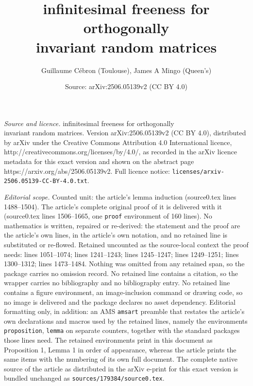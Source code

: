 \documentclass[10pt,a4paper]{amsart}
\title{infinitesimal freeness for orthogonally\\[5pt] invariant random matrices}
\author{Guillaume C\'ebron (Toulouse), James A Mingo (Queen's)}
\date{Source: arXiv:2506.05139v2 (CC BY 4.0)}
\begin{document}
\maketitle

\noindent\emph{Source and licence.} infinitesimal freeness for orthogonally\\[5pt] invariant random matrices. Version arXiv:2506.05139v2 (CC BY 4.0), distributed by arXiv under the Creative Commons Attribution 4.0 International licence, http://creativecommons.org/licenses/by/4.0/, as recorded in the arXiv licence metadata for this exact version and shown on the abstract page https://arxiv.org/abs/2506.05139v2. Full licence notice: \texttt{licenses/arxiv-2506.05139-CC-BY-4.0.txt}.\par\smallskip

\noindent\textit{Editorial scope.} Counted unit: the article's lemma induction (source0.tex lines 1488--1504). The article's complete original proof of it is delivered with it (source0.tex lines 1506--1665, one \texttt{proof} environment of 160 lines). No mathematics is written, repaired or re-derived: the statement and the proof are the article's own lines, in the article's own notation, and no retained line is substituted or re-flowed.  Retained uncounted as the source-local context the proof needs: lines 1051--1074; lines 1241--1243; lines 1245--1247; lines 1249--1251; lines 1300--1312; lines 1473--1484.  Nothing was omitted from any retained span, so the package carries no omission record.  No retained line contains a citation, so the wrapper carries no bibliography and no bibliography entry.  No retained line contains a figure environment, an image-inclusion command or drawing code, so no image is delivered and the package declares no asset dependency.  Editorial formatting only, in addition: an AMS \texttt{amsart} preamble that restates the article's own declarations and macros used by the retained lines, namely the environments \texttt{proposition}, \texttt{lemma} on separate counters, together with the standard packages those lines need.  The retained environments print in this document as Proposition 1, Lemma 1 in order of appearance, whereas the article prints the same items with the numbering of its own full document.  The complete native source of the article as distributed in the arXiv e-print for this exact version is bundled unchanged as \texttt{sources/179384/source0.tex}.
\end{document}
